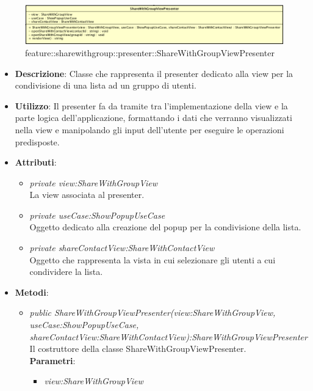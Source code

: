 \label{feature::sharewithgroup::presenter::ShareWithGroupViewPresenter}
\begin{figure}[ht]
	\centering
	\includegraphics[scale=0.5]{Sezioni/SottosezioniST/img/app/ShareWithGroupViewPresenter.png}
	\caption{feature::sharewithgroup::presenter::ShareWithGroupViewPresenter}
\end{figure}

\begin{itemize}
\item \textbf{Descrizione}: Classe che rappresenta il presenter dedicato alla view per la condivisione di una lista ad un gruppo di utenti.
\item \textbf{Utilizzo}: Il presenter fa da tramite tra l'implementazione della view e la parte logica dell'applicazione, formattando i dati che verranno visualizzati nella view e manipolando gli input dell'utente per eseguire le operazioni predisposte.
\item \textbf{Attributi}: 
	\begin{itemize}
	\item \textit{private view:ShareWithGroupView}\\
			La view associata al presenter.
	\item \textit{private useCase:ShowPopupUseCase}\\
		Oggetto dedicato alla creazione del popup per la condivisione della lista.
	\item \textit{private shareContactView:ShareWithContactView}\\
		Oggetto che rappresenta la vista in cui selezionare gli utenti a cui condividere la lista.
	\end{itemize} 
\item \textbf{Metodi}:
	\begin{itemize}
	\item \textit{public ShareWithGroupViewPresenter(view:ShareWithGroupView, useCase:ShowPopupUseCase, \\ shareContactView:ShareWithContactView):ShareWithGroupViewPresenter}\\
	Il costruttore della classe ShareWithGroupViewPresenter.
			\\ \textbf{Parametri}: \begin{itemize}
			\item \textit{view:ShareWithGroupView}\\

\end{itemize}
\end{itemize}
\end{itemize}

